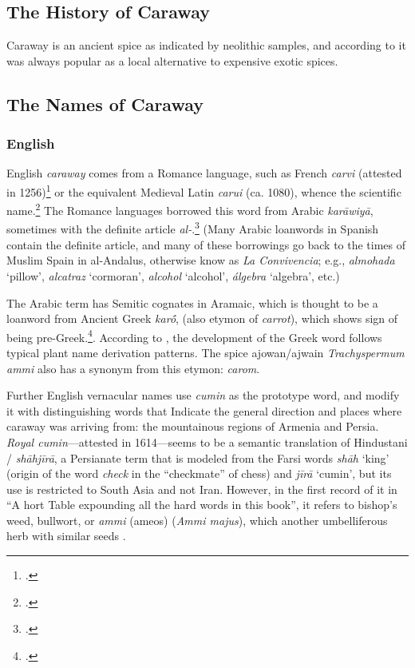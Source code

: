 \subsection{The History of Caraway}

Caraway is an ancient spice as indicated by neolithic samples, and according to \textcite[436]{kiple_cambridge_2000} it was always popular as a local alternative to expensive exotic spices.

\subsection{The Names of Caraway}

\subsubsection{English}



English \textit{caraway} comes from a Romance language, such as  French \textit{carvi} (attested in 1256)\footcite[carvi]{tlfi} or the equivalent Medieval Latin \textit{carui} (ca. 1080), whence the scientific name.\footcites[caraway]{oed}[carvi]{tlfi} The Romance languages borrowed this word from Arabic  \textit{karāwiyā}, sometimes with the definite article \textit{al-}.\footcite{corriente_dictionary_2008} (Many Arabic loanwords in Spanish contain the definite article, and many of these borrowings go back to the times of Muslim Spain in al-Andalus, otherwise know as \textit{La Convivencia}; e.g., \textit{almohada} `pillow', \textit{alcatraz} `cormoran', \textit{alcohol} `alcohol', \textit{álgebra} `algebra', etc.)

The Arabic term has Semitic cognates in Aramaic, which is thought to be a loanword from Ancient Greek  \textit{karṓ}, (also etymon of \textit{carrot}), which shows sign of being pre-Greek.\footcite{beekes_etymological_2010}. According to \textcite{sokoloff_dictionary_2002}, the development of the Greek word follows typical plant name derivation patterns. The spice ajowan/ajwain \textit{Trachyspermum ammi} also has a synonym from this etymon: \textit{carom}.

Further English vernacular names use \textit{cumin} as the prototype word, and modify it with distinguishing words that Indicate the general direction and places where caraway was arriving from: the mountainous regions of Armenia and Persia. \textit{Royal cumin}---attested in 1614---seems to be a semantic translation of Hindustani / \textit{shāhjīrā}, a Persianate term that is modeled from the Farsi words \textit{shāh}
`king' (origin of the word \textit{check} in the ``checkmate'' of chess) and \textit{jīrā} `cumin', but its use is restricted to South Asia and not Iran. However, in the first record of it in ``A \lgS hort Table expounding all the hard words in this book'', it refers to bishop's weed, bullwort, or \textit{ammi} (ameos) (\textit{Ammi majus}), which another umbelliferous herb with similar seeds \autocite[]{markham_cheap_1614}.

